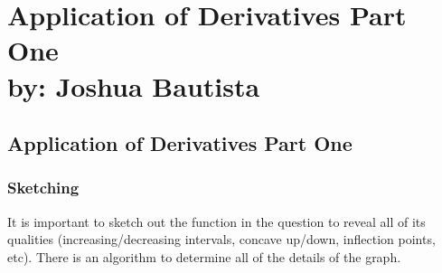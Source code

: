 \documentclass[12pt,fleqn]{book} %
\begin{document}
\part{Application of Derivatives Part One\\ by: Joshua Bautista}


\pagebreak

\chapter{Application of Derivatives Part One}

\section{Sketching}

It is important to sketch out the function in the question to reveal all of its qualities (increasing/decreasing intervals, concave up/down, inflection points, etc).
There is an algorithm to determine all of the details of the graph.

\vspace*{3mm}
\end{document}
